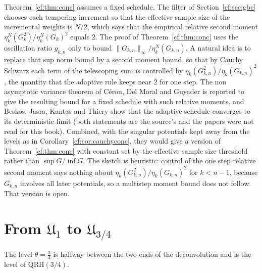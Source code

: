 \begin{remark}\label{cf:rem:adaptive}
Theorem~\ref{cf:thm:conc} assumes a fixed schedule. The filter of Section~\ref{cf:sec:gbc} chooses each tempering increment so that the effective sample size of the incremental weights is $N/2$, which says that the empirical relative second moment $\eta_k^N(G_k^2)/\eta_k^N(G_k)^2$ equals $2$. The proof of Theorem~\ref{cf:thm:conc} uses the oscillation ratio $g_{k,n}$ only to bound $\|G_{k,n}\|_\infty/\eta_k^N(G_{k,n})$. A natural idea is to replace that sup norm bound by a second moment bound, so that by Cauchy Schwarz each term of the telescoping sum is controlled by $\eta_k(G_{k,n}^2)/\eta_k(G_{k,n})^2$, the quantity that the adaptive rule keeps near $2$ for one step. The non asymptotic variance theorem of C\'erou, Del Moral and Guyader \cite{CDG11} is reported to give the resulting bound for a fixed schedule with such relative moments, and Beskos, Jasra, Kantas and Thiery \cite{BJKT16} show that the adaptive schedule converges to its deterministic limit (both statements are the source's and the papers were not read for this book). Combined, with the singular potentials kept away from the levels as in Corollary~\ref{cf:cor:cauchyconc}, they would give a version of Theorem~\ref{cf:thm:conc} with constant set by the effective sample size threshold rather than $\sup G/\inf G$. The sketch is heuristic: control of the one step relative second moment says nothing about $\eta_k(G_{k,n}^2)/\eta_k(G_{k,n})^2$ for $k<n-1$, because $G_{k,n}$ involves all later potentials, so a multistep moment bound does not follow. That version is open.
\end{remark}

\section{From $\mathfrak U_1$ to $\mathfrak U_{3/4}$}\label{cf:sec:u34}

The level $\theta=\frac34$ is halfway between the two ends of the deconvolution and is the level of $\mathrm{QRH}(3/4)$.

